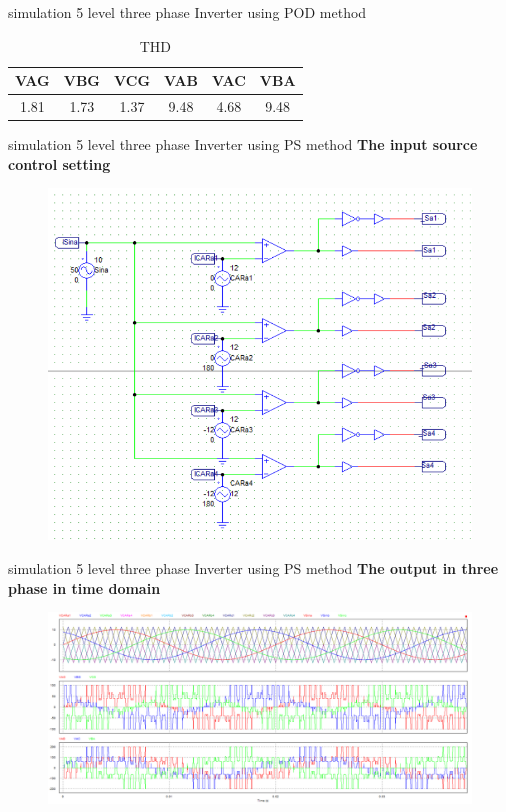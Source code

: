 \documentclass[
	11pt, %
]{beamer}
\begin{document}
\begin{frame}{simulation 5 level three phase Inverter using POD method}
	\begin{table}[htbp]
		\centering
		\caption{THD}
		\label{tab:example}
		\begin{tabular}{|c|c|c|c|c|c|}
			\hline
			VAG & VBG & VCG & VAB & VAC & VBA \\
			\hline
			1.81 & 1.73 & 1.37 & 9.48 & 4.68 & 9.48 \\
			\hline
		\end{tabular}
	\end{table}
\end{frame}

\begin{frame}{simulation 5 level three phase Inverter using PS method}
	\scriptsize{\textbf{The input source control setting}}
	\begin{figure}
        \includegraphics[width=0.7\linewidth]{Sim_PS_source.png}
    \end{figure}
\end{frame}

\begin{frame}{simulation 5 level three phase Inverter using PS method}
	\scriptsize{\textbf{The output in three phase in time domain}}
	\begin{figure}
        \includegraphics[width=1\linewidth]{Sim_PS_out3p.png}
    \end{figure}
\end{frame}
\end{document}
